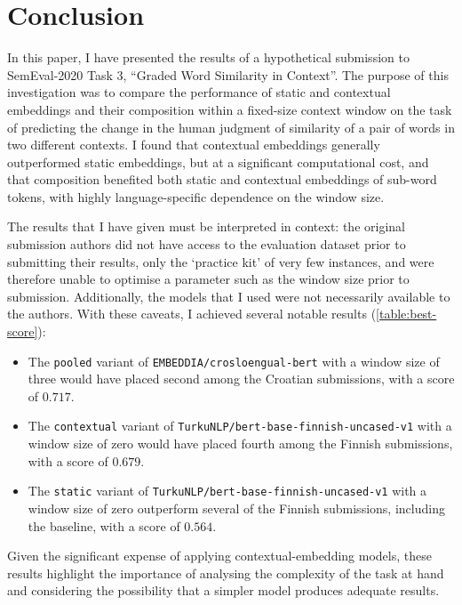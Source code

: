 \section{Conclusion}
\label{sec:conclusion}

In this paper, I have presented the results of a hypothetical submission to
SemEval-2020 Task 3, ``Graded Word Similarity in Context''.
The purpose of this investigation was to compare the performance of static and
contextual embeddings and their composition within a fixed-size context window on the
task of predicting the change in the human judgment of similarity of a pair of words in
two different contexts.
I found that contextual embeddings generally outperformed static embeddings, but at a
significant computational cost, and that composition benefited both static and
contextual embeddings of sub-word tokens, with highly language-specific dependence on
the window size.

The results that I have given must be interpreted in context: the original submission
authors did not have access to the evaluation dataset prior to submitting their
results, only the `practice kit' of very few instances, and were therefore unable to
optimise a parameter such as the window size prior to submission.
Additionally, the models that I used were not necessarily available to the authors.
With these caveats, I achieved several notable results (\cref{table:best-score}):
\begin{itemize}
  \item The \texttt{pooled} variant of \texttt{EMBEDDIA/crosloengual-bert} with a window
        size of three would have placed second among the Croatian submissions, with a
        score of $0.717$.
  \item The \texttt{contextual} variant of \texttt{TurkuNLP/bert-base-finnish-uncased-v1}
        with a window size of zero would have placed fourth among the Finnish
        submissions, with a score of $0.679$.
  \item The \texttt{static} variant of \texttt{TurkuNLP/bert-base-finnish-uncased-v1}
        with a window size of zero outperform several of the Finnish submissions,
        including the baseline, with a score of $0.564$.
\end{itemize}
Given the significant expense of applying contextual-embedding models, these results
highlight the importance of analysing the complexity of the task at hand and
considering the possibility that a simpler model produces adequate results.
